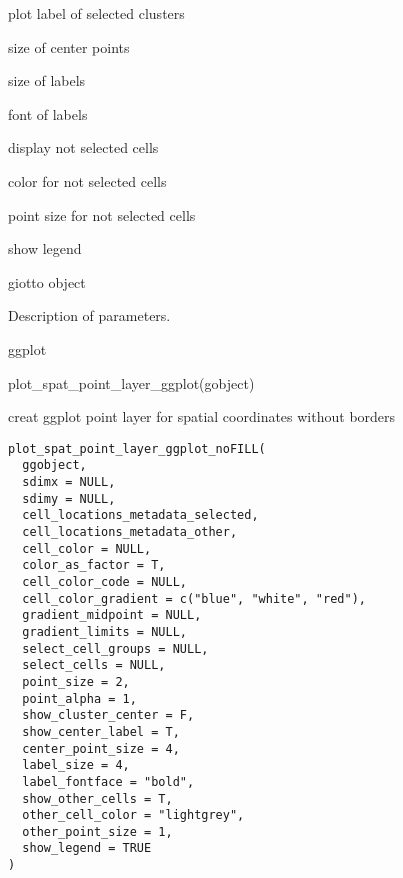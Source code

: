 \documentclass[a4paper]{book}
\begin{document}
\begin{Arguments}
\begin{ldescription}
\item[\code{show\_center\_label}] plot label of selected clusters

\item[\code{center\_point\_size}] size of center points

\item[\code{label\_size}] size of labels

\item[\code{label\_fontface}] font of labels

\item[\code{show\_other\_cells}] display not selected cells

\item[\code{other\_cell\_color}] color for not selected cells

\item[\code{other\_point\_size}] point size for not selected cells

\item[\code{show\_legend}] show legend

\item[\code{gobject}] giotto object
\end{ldescription}
\end{Arguments}
%
\begin{Details}\relax
Description of parameters.
\end{Details}
%
\begin{Value}
ggplot
\end{Value}
%
\begin{Examples}
\begin{ExampleCode}
    plot_spat_point_layer_ggplot(gobject)
\end{ExampleCode}
\end{Examples}
%
\begin{Description}\relax
creat ggplot point layer for spatial coordinates without borders
\end{Description}
%
\begin{Usage}
\begin{verbatim}
plot_spat_point_layer_ggplot_noFILL(
  ggobject,
  sdimx = NULL,
  sdimy = NULL,
  cell_locations_metadata_selected,
  cell_locations_metadata_other,
  cell_color = NULL,
  color_as_factor = T,
  cell_color_code = NULL,
  cell_color_gradient = c("blue", "white", "red"),
  gradient_midpoint = NULL,
  gradient_limits = NULL,
  select_cell_groups = NULL,
  select_cells = NULL,
  point_size = 2,
  point_alpha = 1,
  show_cluster_center = F,
  show_center_label = T,
  center_point_size = 4,
  label_size = 4,
  label_fontface = "bold",
  show_other_cells = T,
  other_cell_color = "lightgrey",
  other_point_size = 1,
  show_legend = TRUE
)
\end{verbatim}
\end{Usage}
\end{document}
